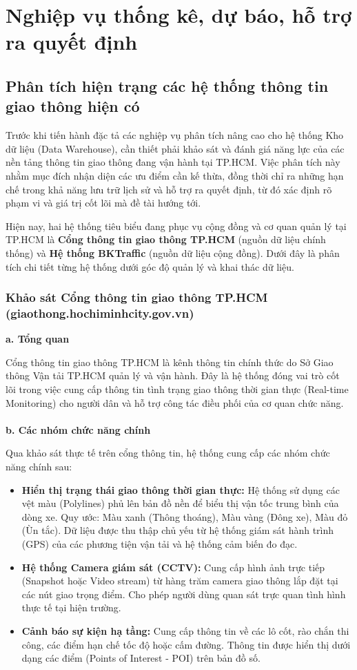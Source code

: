 \section{Nghiệp vụ thống kê, dự báo, hỗ trợ ra quyết định}
\subsection{Phân tích hiện trạng các hệ thống thông tin giao thông hiện có}

Trước khi tiến hành đặc tả các nghiệp vụ phân tích nâng cao cho hệ thống Kho dữ liệu (Data Warehouse), cần thiết phải khảo sát và đánh giá năng lực của các nền tảng thông tin giao thông đang vận hành tại TP.HCM. Việc phân tích này nhằm mục đích nhận diện các ưu điểm cần kế thừa, đồng thời chỉ ra những hạn chế trong khả năng lưu trữ lịch sử và hỗ trợ ra quyết định, từ đó xác định rõ phạm vi và giá trị cốt lõi mà đề tài hướng tới.

Hiện nay, hai hệ thống tiêu biểu đang phục vụ cộng đồng và cơ quan quản lý tại TP.HCM là \textbf{Cổng thông tin giao thông TP.HCM} (nguồn dữ liệu chính thống) và \textbf{Hệ thống BKTraffic} (nguồn dữ liệu cộng đồng). Dưới đây là phân tích chi tiết từng hệ thống dưới góc độ quản lý và khai thác dữ liệu.

\subsubsection{Khảo sát Cổng thông tin giao thông TP.HCM (giaothong.hochiminhcity.gov.vn)}

\textbf{a. Tổng quan}

Cổng thông tin giao thông TP.HCM là kênh thông tin chính thức do Sở Giao thông Vận tải TP.HCM quản lý và vận hành. Đây là hệ thống đóng vai trò cốt lõi trong việc cung cấp thông tin tình trạng giao thông thời gian thực (Real-time Monitoring) cho người dân và hỗ trợ công tác điều phối của cơ quan chức năng.\\
\\
\textbf{b. Các nhóm chức năng chính}

Qua khảo sát thực tế trên cổng thông tin, hệ thống cung cấp các nhóm chức năng chính sau:
\begin{itemize}
    \item \textbf{Hiển thị trạng thái giao thông thời gian thực:} Hệ thống sử dụng các vệt màu (Polylines) phủ lên bản đồ nền để biểu thị vận tốc trung bình của dòng xe. Quy ước: Màu xanh (Thông thoáng), Màu vàng (Đông xe), Màu đỏ (Ùn tắc). Dữ liệu được thu thập chủ yếu từ hệ thống giám sát hành trình (GPS) của các phương tiện vận tải và hệ thống cảm biến đo đạc.
    \item \textbf{Hệ thống Camera giám sát (CCTV):} Cung cấp hình ảnh trực tiếp (Snapshot hoặc Video stream) từ hàng trăm camera giao thông lắp đặt tại các nút giao trọng điểm. Cho phép người dùng quan sát trực quan tình hình thực tế tại hiện trường.
    \item \textbf{Cảnh báo sự kiện hạ tầng:} Cung cấp thông tin về các lô cốt, rào chắn thi công, các điểm hạn chế tốc độ hoặc cấm đường. Thông tin được hiển thị dưới dạng các điểm (Points of Interest - POI) trên bản đồ số.
\end{itemize}

